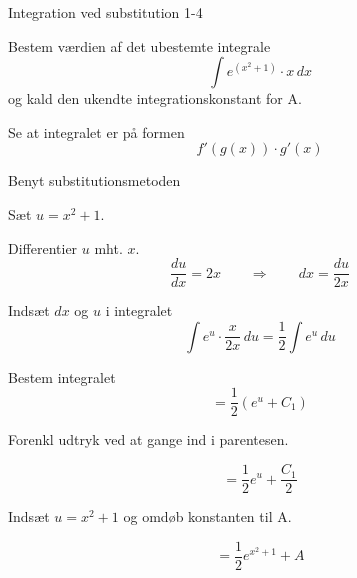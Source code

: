 \documentclass{article}
\begin{document}
\begin{exercise}{Integration ved substitution 1-4}


Bestem værdien af det ubestemte integrale
\[
\int e^{(x^2 + 1)} \cdot x \, dx
\]
og kald den ukendte integrationskonstant for A.




\hint

Se at integralet er på formen
\[
f'(g(x)) \cdot g'(x)
\]

\hint

Benyt substitutionsmetoden

\hint

Sæt $u=x^2 + 1$.


\hint

Differentier $u$ mht. $x$.
\[
\frac{du}{dx} = 2x \qquad\Rightarrow \qquad dx = \frac{du}{2x}
\]

\hint

Indsæt $dx$ og $u$ i integralet
\[
\int e^{u} \cdot \frac{x}{2x} \, du = \frac{1}{2} \int e^u \, du
\]

\hint

Bestem integralet
\[
= \frac{1}{2} \left( e^u + C_1 \right)
\]

\hint
Forenkl udtryk ved at gange ind i parentesen.

\hint

\[
= \frac{1}{2} e^u + \frac{C_1}{2}
\]

\hint

Indsæt $u = x^2 + 1$ og omdøb konstanten til A.

\hint

\[
= \frac{1}{2} e^{x^2 + 1} + A
\]


\end{exercise}

\newpage
\end{document}
